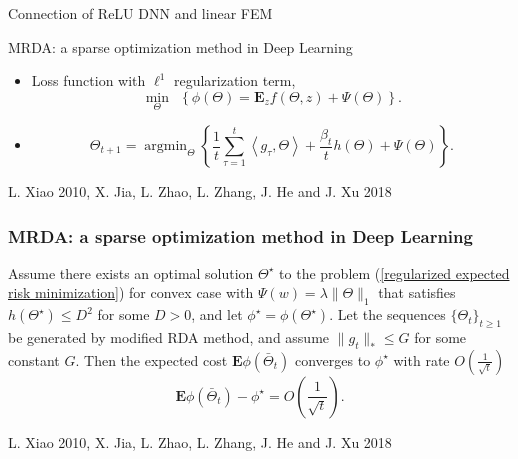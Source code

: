\documentclass{beamer}
\begin{document}
\begin{CJK*}{UTF8}{gbsn}
\begin{frame}{Connection of ReLU DNN and linear FEM}
\end{frame}


\begin{frame}{MRDA: a sparse optimization method in Deep Learning}
\begin{itemize}
	\item 	Loss function with $\ell^1$ regularization term,
	\begin{equation}\label{regularized expected risk minimization}
	\min_{\Theta}~~\left\lbrace \phi(\Theta) =  \mathbf{E}_z f(\Theta,z)+\Psi(\Theta)\right\rbrace.
	\end{equation}
	\item 
	$$
	\Theta_{t+1} =\mathop{\arg\min}_\Theta \left\{\frac{1}{t} \sum_{\tau=1}^{t} \left<g_{\tau},\Theta \right>+\frac{\beta_t}{t}h(\Theta)+\Psi(\Theta)\right\}.
	$$
\end{itemize}
\vspace{2.5cm}
\vfill 
\tiny {}  {L. Xiao 2010, X. Jia, L. Zhao, L. Zhang, J. He and J. Xu 2018}
\end{frame}

\begin{frame}\frametitle{MRDA: a sparse optimization method in Deep Learning}
\begin{theorem}\label{Convergence_Modified_RDA}
Assume there exists an optimal solution $\Theta^{\star}$ to the problem (\ref{regularized expected risk minimization}) for convex case with $\Psi(w)=\lambda\|\Theta\|_1$ that satisfies $h(\Theta^{\star})\leq D^2$ for some $D>0$, and let $\phi^{\star}=\phi(\Theta^{\star}).$ Let the sequences $\{\Theta_t\}_{t\geq 1}$ be generated by modified RDA method, and assume $\|g_t\|_{\ast}\leq G$ for some constant $G$. Then the expected cost $\mathbf{E}\phi(\bar{\Theta}_t)$ converges to $\phi^{\star}$ with rate $O(\frac{1}{\sqrt{t}})$
$$
\mathbf{E}\phi(\bar{\Theta}_t)-\phi^{\star}
= O(\frac{1}{\sqrt{t}}).
$$
\end{theorem}
\vspace{1.5cm}
\vfill 
\tiny {}  {L. Xiao 2010, X. Jia, L. Zhao, L. Zhang, J. He and J. Xu 2018}
\end{frame}


\end{CJK*}
\end{document}
